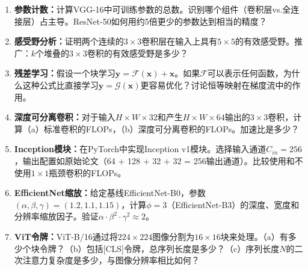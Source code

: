 \begin{enumerate}
    \item \textbf{参数计数：}计算VGG-16中可训练参数的总数。识别哪个组件（卷积层vs.全连接层）占主导。ResNet-50如何用约5倍更少的参数达到相当的精度？

    \item \textbf{感受野分析：}证明两个连续的$3\times3$卷积层在输入上具有$5\times5$的有效感受野。推广：$k$个堆叠的$3\times3$卷积的有效感受野是多少？

    \item \textbf{残差学习：}假设一个块学习$\mathbf{y} = \mathcal{F}(\mathbf{x}) + \mathbf{x}$。如果$\mathcal{F}$可以表示任何函数，为什么这种公式比直接学习$\mathbf{y} = \mathcal{G}(\mathbf{x})$更容易优化？讨论恒等映射在梯度流中的作用。

    \item \textbf{深度可分离卷积：}对于输入$H\times W\times 32$和产生$H\times W\times 64$输出的$3\times3$卷积，计算（a）标准卷积的FLOPs，（b）深度可分离卷积的FLOPs。加速比是多少？

    \item \textbf{Inception模块：}在PyTorch中实现Inception v1模块。选择输入通道$C_{in}=256$，输出配置如原始论文（64 + 128 + 32 + 32 = 256输出通道）。比较使用和不使用$1\times1$瓶颈卷积的FLOPs。

    \item \textbf{EfficientNet缩放：}给定基线EfficientNet-B0，参数$(\alpha, \beta, \gamma) = (1.2, 1.1, 1.15)$，计算$\phi = 3$（EfficientNet-B3）的深度、宽度和分辨率缩放因子。验证$\alpha\cdot\beta^2\cdot\gamma^2 \approx 2$。

    \item \textbf{ViT令牌：}ViT-B/16通过将$224\times224$图像分割为$16\times16$块来处理。（a）有多少个块令牌？（b）包括[CLS]令牌，总序列长度是多少？（c）序列长度$N$的二次注意力复杂度是多少，与图像分辨率相比如何？
\end{enumerate}
